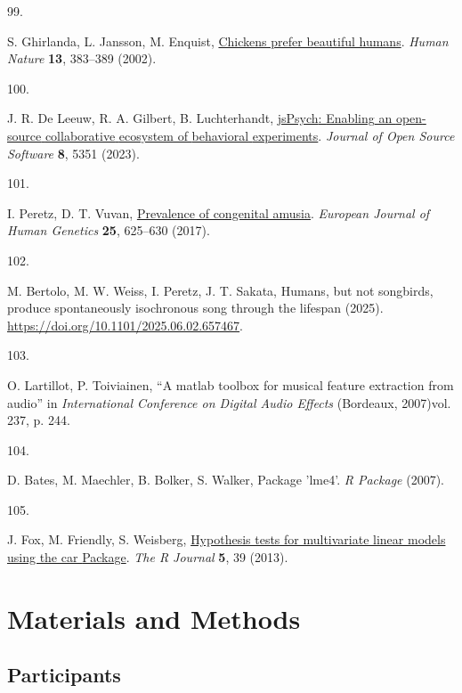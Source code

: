 \documentclass[
]{article}
\newlength{\cslhangindent}
\newlength{\csllabelwidth}
\newenvironment{CSLReferences}[2] %
 {\begin{list}{}{%
  \setlength{\itemindent}{0pt}
  \setlength{\leftmargin}{0pt}
  \setlength{\parsep}{0pt}
  \ifodd #1
   \setlength{\leftmargin}{\cslhangindent}
   \setlength{\itemindent}{-1\cslhangindent}
  \fi
  \setlength{\itemsep}{#2\baselineskip}}}
 {\end{list}}
\newcommand{\CSLLeftMargin}[1]{\parbox[t]{\csllabelwidth}{\strut#1\strut}}
\newcommand{\CSLRightInline}[1]{\parbox[t]{\linewidth - \csllabelwidth}{\strut#1\strut}}
\begin{document}
\begin{CSLReferences}{0}{0}
\CSLLeftMargin{99. }%
\CSLRightInline{S. Ghirlanda, L. Jansson, M. Enquist,
\href{https://doi.org/10.1007/s12110-002-1021-6}{Chickens prefer
beautiful humans}. \emph{Human Nature} \textbf{13}, 383--389 (2002).}

\CSLLeftMargin{100. }%
\CSLRightInline{J. R. De Leeuw, R. A. Gilbert, B. Luchterhandt,
\href{https://doi.org/10.21105/joss.05351}{{jsPsych}: {Enabling} an
{open}-{source} {collaborative} {ecosystem} of {behavioral}
{experiments}}. \emph{Journal of Open Source Software} \textbf{8}, 5351
(2023).}

\CSLLeftMargin{101. }%
\CSLRightInline{I. Peretz, D. T. Vuvan,
\href{https://doi.org/10.1038/ejhg.2017.15}{Prevalence of congenital
amusia}. \emph{European Journal of Human Genetics} \textbf{25}, 625--630
(2017).}

\CSLLeftMargin{102. }%
\CSLRightInline{M. Bertolo, M. W. Weiss, I. Peretz, J. T. Sakata,
Humans, but not songbirds, produce spontaneously isochronous song
through the lifespan (2025).
\url{https://doi.org/10.1101/2025.06.02.657467}.}

\CSLLeftMargin{103. }%
\CSLRightInline{O. Lartillot, P. Toiviainen, {``A matlab toolbox for
musical feature extraction from audio''} in \emph{International
Conference on Digital Audio Effects} (Bordeaux, 2007)vol. 237, p. 244.}

\CSLLeftMargin{104. }%
\CSLRightInline{D. Bates, M. Maechler, B. Bolker, S. Walker, Package
'lme4'. \emph{R Package} (2007).}

\CSLLeftMargin{105. }%
\CSLRightInline{J. Fox, M. Friendly, S. Weisberg,
\href{https://doi.org/10.32614/RJ-2013-004}{Hypothesis tests for
multivariate linear models using the car {Package}}. \emph{The R
Journal} \textbf{5}, 39 (2013).}

\end{CSLReferences}

\normalsize

\section{Materials and Methods}\label{materials-and-methods}

\subsection{Participants}\label{participants}
\end{document}
